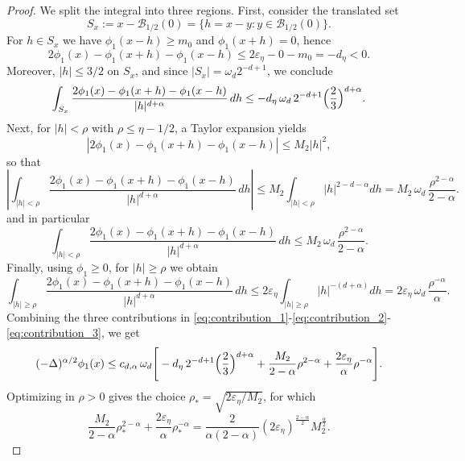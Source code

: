 \documentclass[11pt,handout]{article}%
\numberwithin{equation}{section}
\newcommand{\abs}[1]{\left|#1\right|}
\theoremstyle{definition}
\begin{document}
\begin{proof}
	We split the integral into three regions. First, consider the translated set 
	\[ 
	S_x := x - \mathcal{B}_{1/2}(0) = \{ h = x-y : y\in \mathcal{B}_{1/2}(0)\}.
	\]   For $h\in S_x$ we have $\phi_1(x-h)\ge m_0$ and $\phi_1(x+h)=0$, hence
	\[
	2\phi_1(x)-\phi_1(x+h)-\phi_1(x-h) \le 2 \varepsilon_\eta-0-m_0 = -d_\eta<0.
	\]
	Moreover, $|h|\le 3/2$ on $S_x$, and since $\abs{S_x}=\omega_d 2^{-d+1}$, we conclude
	\begin{equation}\label{eq:contribution_1}
		\int_{S_x}\frac{2\phi_1(x)-\phi_1(x+h)-\phi_1(x-h)}{|h|^{d+\alpha}}\,dh
		\le - d_\eta\,\omega_d\,2^{-d+1}\Bigl(\frac{2}{3}\Bigr)^{d+\alpha}.
	\end{equation}
	Next, for $|h|<\rho$ with $\rho\le \eta-1/2$, a Taylor expansion yields
	\[
	|2\phi_1(x)-\phi_1(x+h)-\phi_1(x-h)| \le M_2 |h|^2,
	\]
	so that
	\begin{equation*}
		\left| \int_{|h|<\rho}\frac{2\phi_1(x)-\phi_1(x+h)-\phi_1(x-h)}{|h|^{d+\alpha}}\,dh\right| \leq M_2 \int_{|h|<\rho} \vert h \vert^{2-d-\alpha} dh  
		= M_2\,\omega_d\,\frac{\rho^{2-\alpha}}{2-\alpha}.
	\end{equation*}
	and in particular 
	\begin{equation}\label{eq:contribution_2}
		\int_{|h|<\rho}\frac{2\phi_1(x)-\phi_1(x+h)-\phi_1(x-h)}{|h|^{d+\alpha}}\,dh
		\le M_2\,\omega_d\,\frac{\rho^{2-\alpha}}{2-\alpha}.
	\end{equation}
	Finally, using $\phi_1\ge 0$, for $|h|\ge \rho$ we obtain
	\begin{equation}\label{eq:contribution_3}
		\int_{|h|\ge \rho}\frac{2\phi_1(x)-\phi_1(x+h)-\phi_1(x-h)}{|h|^{d+\alpha}}\,dh
		\le 2\varepsilon_\eta \int_{\abs{h}\geq \rho} \abs{h}^{-(d+\alpha)} dh = 2\varepsilon_\eta\,\omega_d\,\frac{\rho^{-\alpha}}{\alpha} .
	\end{equation}
	Combining the three contributions in \eqref{eq:contribution_1}-\eqref{eq:contribution_2}-\eqref{eq:contribution_3}, we get
	\begin{equation*}
		(-\Delta)^{\alpha/2}\phi_1(x)
		\le c_{d,\alpha}\,\omega_d\Bigg[
		- d_\eta\,2^{-d+1}\Bigl(\frac{2}{3}\Bigr)^{d+\alpha}
		+ \frac{M_2}{2-\alpha}\rho^{2-\alpha}
		+ \frac{2\varepsilon_\eta}{\alpha}\rho^{-\alpha}
		\Bigg].
	\end{equation*}
	Optimizing in $\rho>0$ gives the choice $\rho_*=\sqrt{2\varepsilon_\eta/M_2}$, for which
	\[
	\frac{M_2}{2-\alpha}\rho_*^{2-\alpha}
	+ \frac{2\varepsilon_\eta}{\alpha}\rho_*^{-\alpha}
	= \frac{2}{\alpha(2-\alpha)}(2\varepsilon_\eta)^{\frac{2-\alpha}{2}} M_2^{\frac{\alpha}{2}}.
\]
\end{proof}
\end{document}
